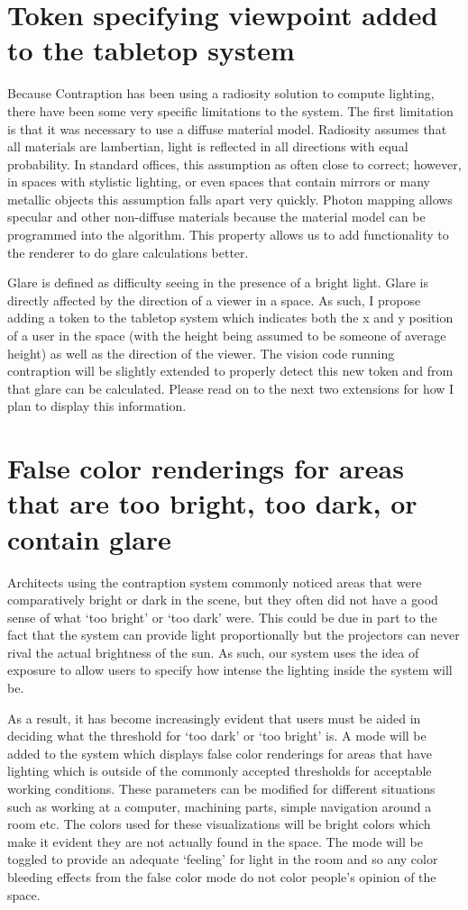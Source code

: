\section{Token specifying viewpoint added to the tabletop system}
\label{token}
Because Contraption has been using a radiosity solution to compute lighting, there have been some very specific limitations to the system.  The first limitation is that it was necessary to use a diffuse material model.  Radiosity assumes that all materials are lambertian, light is reflected in all directions with equal probability.  In standard offices, this assumption as often close to correct; however, in spaces with stylistic lighting, or even spaces that contain mirrors or many metallic objects this assumption falls apart very quickly.  Photon mapping allows specular and other non-diffuse materials because the material model can be programmed into the algorithm.  This property allows us to add functionality to the renderer to do glare calculations better.

Glare is defined as difficulty seeing in the presence of a bright light.  Glare is directly affected by the direction of a viewer in a space.  As such, I  propose adding a token to the tabletop system which indicates both the x and y position of a user in the space (with the height being assumed to be someone of average height) as well as the direction of the viewer.  The vision code running contraption will be slightly extended to properly detect this new token and from that glare can be calculated.  Please read on to the next two extensions for how I plan to display this information.  

\section{False color renderings for areas that are too bright, too dark, or contain glare}

Architects using the contraption system commonly noticed areas that were comparatively bright or dark in the scene, but they often did not have a good sense of what `too bright' or `too dark' were.  This could be due in part to the fact that the system can provide light proportionally but the projectors can never rival the actual brightness of the sun.  As such, our system uses the idea of exposure to allow users to specify how intense the lighting inside the system will be.

As a result, it has become increasingly evident that users must be aided in deciding what the threshold for `too dark' or `too bright' is.  A mode will be added to the system which displays false color renderings for areas that have lighting which is outside of the commonly accepted thresholds for acceptable working conditions.  These parameters can be modified for different situations such as working at a computer, machining parts, simple navigation around a room etc.  The colors used for these visualizations will be bright colors which make it evident they are not actually found in the space.  The mode will be toggled to provide an adequate `feeling' for light in the room and so any color bleeding effects from the false color mode do not color people's opinion of the space.

